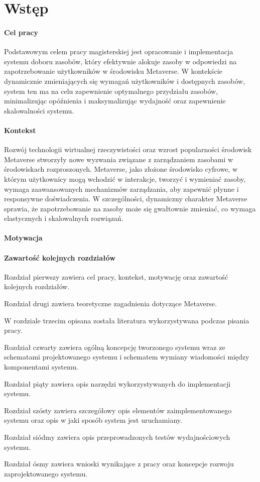 \chapter{Wstęp}


\subsubsection{Cel pracy}

Podstawowym celem pracy magisterskiej jest opracowanie i implementacja systemu doboru zasobów, który efektywnie alokuje zasoby w odpowiedzi na zapotrzebowanie użytkowników w środowisku Metaverse. W kontekście dynamicznie zmieniających się wymagań użytkowników i dostępnych zasobów, system ten ma na celu zapewnienie optymalnego przydziału zasobów, minimalizując opóźnienia i maksymalizując wydajność oraz zapewnienie skalowalności systemu.

\subsubsection{Kontekst}

Rozwój technologii wirtualnej rzeczywistości oraz wzrost popularności środowisk Metaverse stworzyły nowe wyzwania związane z zarządzaniem zasobami w środowiskach rozproszonych. Metaverse, jako złożone środowisko cyfrowe, w którym użytkownicy mogą wchodzić w interakcje, tworzyć i wymieniać zasoby, wymaga zaawansowanych mechanizmów zarządzania, aby zapewnić płynne i responsywne doświadczenia. W szczególności, dynamiczny charakter Metaverse sprawia, że zapotrzebowanie na zasoby może się gwałtownie zmieniać, co wymaga elastycznych i skalowalnych rozwiązań.

\subsubsection{Motywacja}



\subsubsection{Zawartość kolejnych rozdziałów}

Rozdział pierwszy zawiera cel pracy, kontekst, motywację oraz zawartość kolejnych rozdziałów.

Rozdział drugi zawiera teoretyczne zagadnienia dotyczące Metaverse.  

W rozdziale trzecim opisana została literatura wykorzystywana podczas pisania pracy.

Rozdział czwarty zawiera ogólną koncepcję tworzonego systemu wraz ze schematami projektowanego systemu i schematem wymiany wiadomości między komponentami systemu.

Rozdział piąty zawiera opis narzędzi wykorzystywanych do implementacji systemu.

Rozdział szósty zawiera szczegółowy opis elementów zaimplementowanego systemu oraz opis  w jaki sposób system jest uruchamiany.

Rozdział siódmy zawiera opis przeprowadzonych testów wydajnościowych systemu.

Rozdział ósmy zawiera wnioski wynikające z pracy oraz koncepcje rozwoju zaprojektowanego systemu.